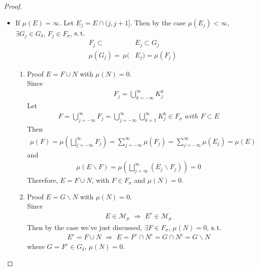 \begin{enumerate}
\begin{proof}
\begin{itemize}
				\item If $\mu(E) = \infty$. Let $E_j = E \cap (j , j + 1]$. Then by the case $\mu(E_j) < \infty$, \\
				$\exists G_j \in G_\delta$, $F_j \in F_\sigma$, $\operatorname{s.t.}$
				\begin{align}
					F_j \subset \, &E_j \subset G_j \\
					\mu(G_j) = \, \mu(&E_j) =\mu(F_j)
				\end{align}
				\begin{enumerate}
					\item Proof $E = F \cup N$ with $\mu(N) = 0$. \\
					Since
					\begin{align}
						F_j = \bigcup_{k = -\infty}^{\infty}{K_{j}^k}
					\end{align}
					Let
					\begin{align}
						F = \bigcup_{j = -\infty}^{\infty}{F_j} = \bigcup_{j = -\infty}^{\infty} \bigcup_{k = 1}^{\infty} K_{j}^k \in F_\sigma \,\, with \,\, F \subset E
					\end{align}
					Then
					\begin{align}
						\mu(F) 
						= \mu(\bigsqcup_{j = -\infty}^{\infty}{F_j}) 
						= \sum_{j = -\infty}^{\infty}{\mu(F_j)} 
						= \sum_{j = -\infty}^{\infty}{\mu(E_j)} 
						= \mu(E)
					\end{align}
					and
					\begin{align}
						\mu(E \backslash F) = \mu(\bigsqcup_{j = \infty}^{\infty}{(E_j \backslash F_j)}) = 0
					\end{align}
					Therefore, $E = F \cup N$, with $F \in F_\sigma$ and $\mu(N) = 0$.
					
					\vspace*{14em}
					
					\item Proof $E = G \backslash N$ with $\mu(N) = 0$. \\
					Since 
					\begin{align}
						E \in \mathcal{M}_\mu \,\, \Rightarrow \,\, E^c \in \mathcal{M}_\mu
					\end{align}
					Then by the case we've just discussed, $\exists F \in F_\sigma$, $\mu(N) = 0$, $\operatorname{s.t.}$
					\begin{align}
						E^c = F \cup N \,\, \Rightarrow \,\, E = F^c \cap N^c = G \cap N^c = G \backslash N
					\end{align}
					where $G = F^c \in G_\delta$, $\mu(N) = 0$.
				\end{enumerate}
			\end{itemize}
		\end{proof}
		

\end{enumerate}
